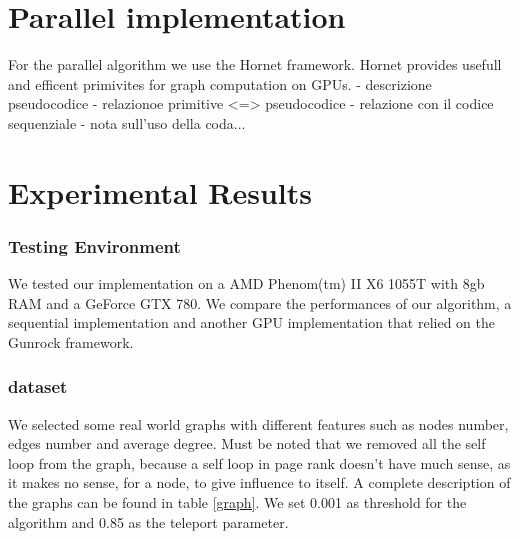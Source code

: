 \documentclass[journal]{IEEEtran}
\begin{document}
\section{Parallel implementation} 
For the parallel algorithm we use the Hornet framework. Hornet provides
usefull and efficent primivites for graph computation on GPUs.
- descrizione pseudocodice
- relazionoe primitive <=> pseudocodice
- relazione con il codice sequenziale
- nota sull'uso della coda... 

\section{Experimental Results} 
\subsubsection{Testing Environment}
We tested our implementation on a AMD Phenom(tm) II X6 1055T with 8gb RAM and 
a GeForce GTX 780.
We compare the performances of our algorithm, a sequential implementation and
another GPU implementation that relied on the Gunrock framework.
\subsubsection{dataset}
We selected some real world graphs with different features such as
nodes number, edges number and average degree.
Must be noted that we removed all the self loop from the graph, because a self
loop in page rank doesn't have much sense, as it makes no sense, for a node,
to give influence to itself.
A complete description of the graphs can be found in table \ref{graph}.
We set 0.001 as threshold for the algorithm and 0.85 as the teleport parameter.
\end{document}
